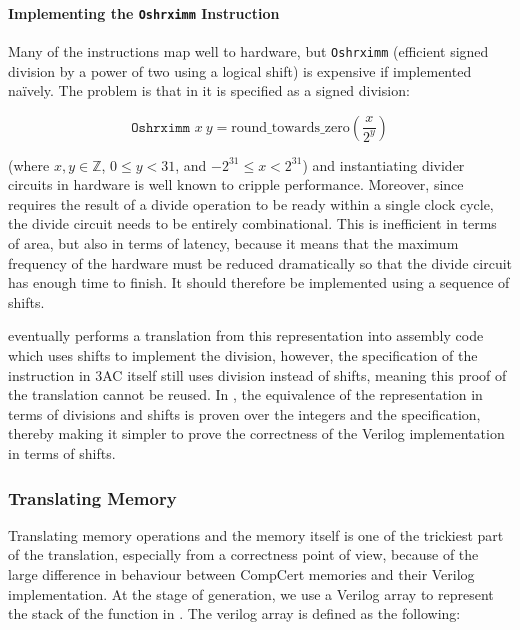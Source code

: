 \paragraph{Implementing the \texttt{Oshrximm} Instruction}%
\label{sec:algorithm:optimisation:oshrximm}


Many of the \compcert{} instructions map well to hardware, but \texttt{Oshrximm}
(efficient signed division by a power of two using a logical shift) is expensive
if implemented na\"ively. The problem is that in \compcert{} it is specified as
a signed division:

\begin{equation*}
  \texttt{Oshrximm } x\ y = \text{round\_towards\_zero}\left(\frac{x}{2^{y}}\right)
\end{equation*}

(where $x, y \in \mathbb{Z}$, $0 \leq y < 31$, and $-2^{31} \leq x < 2^{31}$)
and instantiating divider circuits in hardware is well known to cripple
performance. Moreover, since \vericert{} requires the result of a divide
operation to be ready within a single clock cycle, the divide circuit needs to
be entirely combinational. This is inefficient in terms of area, but also in
terms of latency, because it means that the maximum frequency of the hardware
must be reduced dramatically so that the divide circuit has enough time to
finish.  It should therefore be implemented using a sequence of shifts.

\compcert{} eventually performs a translation from this representation into
assembly code which uses shifts to implement the division, however, the
specification of the instruction in 3AC itself still uses division instead of
shifts, meaning this proof of the translation cannot be reused.  In \vericert{},
the equivalence of the representation in terms of divisions and shifts is proven
over the integers and the specification, thereby making it simpler to prove the
correctness of the Verilog implementation in terms of shifts.

\subsubsection{Translating Memory}
\label{sec:hg:translating-memory}

Translating memory operations and the memory itself is one of the trickiest part
of the translation, especially from a correctness point of view, because of the
large difference in behaviour between CompCert memories and their Verilog
implementation.  At the stage of \htl{} generation, we use a Verilog array to
represent the stack of the function in \rtlsubpar{}.  The verilog array is
defined as the following:

